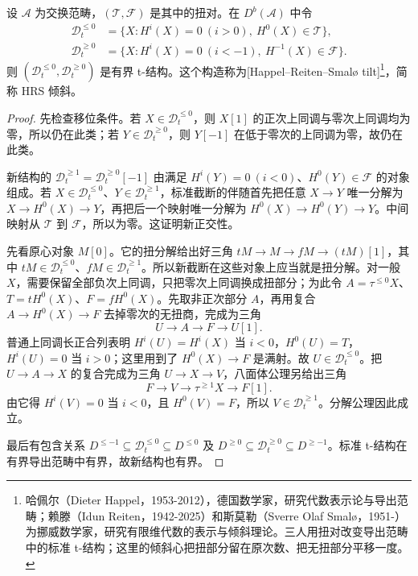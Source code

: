 \begin{theorem}\label{b4:thm:hrs-tilt}
	设 \(\mathcal A\) 为交换范畴，\((\mathcal T,\mathcal F)\) 是其中的扭对。在 \(D^b(\mathcal A)\) 中令
	\begin{align*}
		\mathcal D_t^{\le0}&=\{X:H^i(X)=0\ (i>0),\ H^0(X)\in\mathcal T\},\\
		\mathcal D_t^{\ge0}&=\{X:H^i(X)=0\ (i<-1),\ H^{-1}(X)\in\mathcal F\}.
	\end{align*}
	则 \((\mathcal D_t^{\le0},\mathcal D_t^{\ge0})\) 是有界 t-结构。这个构造称为[Happel--Reiten--Smalø tilt]\footnote{哈佩尔（Dieter Happel，1953-2012），德国数学家，研究代数表示论与导出范畴；赖滕（Idun Reiten，1942-2025）和斯莫勒（Sverre Olaf Smalø，1951-）为挪威数学家，研究有限维代数的表示与倾斜理论。三人用扭对改变导出范畴中的标准 t-结构；这里的倾斜心把扭部分留在原次数、把无扭部分平移一度。}，简称 HRS 倾斜\cite[Chapter I, \S2]{HappelReitenSmalo1996Tilting}。
\end{theorem}
\begin{proof}
	先检查移位条件。若 \(X\in\mathcal D_t^{\le0}\)，则 \(X[1]\) 的正次上同调与零次上同调均为零，所以仍在此类；若 \(Y\in\mathcal D_t^{\ge0}\)，则 \(Y[-1]\) 在低于零次的上同调为零，故仍在此类。

	新结构的 \(\mathcal D_t^{\ge1}=\mathcal D_t^{\ge0}[-1]\) 由满足 \(H^i(Y)=0\ (i<0)\)、\(H^0(Y)\in\mathcal F\) 的对象组成。若 \(X\in\mathcal D_t^{\le0}\)、\(Y\in\mathcal D_t^{\ge1}\)，标准截断的伴随首先把任意 \(X\to Y\) 唯一分解为 \(X\to H^0(X)\to Y\)，再把后一个映射唯一分解为 \(H^0(X)\to H^0(Y)\to Y\)。中间映射从 \(\mathcal T\) 到 \(\mathcal F\)，所以为零。这证明新正交性。

	先看原心对象 \(M[0]\)。它的扭分解给出好三角 \(tM\to M\to fM\to(tM)[1]\)，其中 \(tM\in\mathcal D_t^{\le0}\)、\(fM\in\mathcal D_t^{\ge1}\)。所以新截断在这些对象上应当就是扭分解。对一般 \(X\)，需要保留全部负次上同调，只把零次上同调换成扭部分；为此令 \(A=\tau^{\le0}X\)、\(T=tH^0(X)\)、\(F=fH^0(X)\)。先取非正次部分 \(A\)，再用复合 \(A\to H^0(X)\to F\) 去掉零次的无扭商，完成为三角
	\[
		U\longrightarrow A\longrightarrow F\longrightarrow U[1].
	\]
	普通上同调长正合列表明 \(H^i(U)=H^i(X)\) 当 \(i<0\)，\(H^0(U)=T\)，\(H^i(U)=0\) 当 \(i>0\)；这里用到了 \(H^0(X)\to F\) 是满射。故 \(U\in\mathcal D_t^{\le0}\)。把 \(U\to A\to X\) 的复合完成为三角 \(U\to X\to V\)，八面体公理另给出三角
	\[
		F\longrightarrow V\longrightarrow\tau^{\ge1}X\longrightarrow F[1].
	\]
	由它得 \(H^i(V)=0\) 当 \(i<0\)，且 \(H^0(V)=F\)，所以 \(V\in\mathcal D_t^{\ge1}\)。分解公理因此成立。

	最后有包含关系 \(D^{\le-1}\subseteq\mathcal D_t^{\le0}\subseteq D^{\le0}\) 及 \(D^{\ge0}\subseteq\mathcal D_t^{\ge0}\subseteq D^{\ge-1}\)。标准 t-结构在有界导出范畴中有界，故新结构也有界。
\end{proof}

